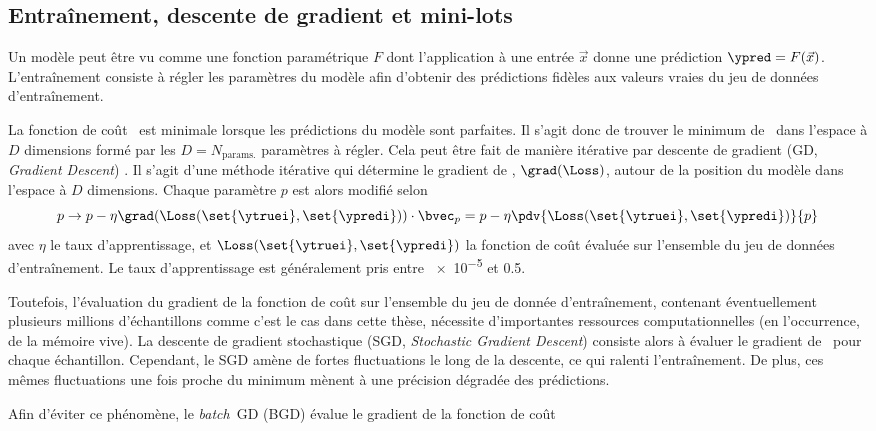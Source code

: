 \subsection{Entraînement, descente de gradient et mini-lots}\label{chapter-ML-section-gradient_descent}
Un modèle peut être vu comme une fonction paramétrique $F$
dont l'application à une entrée $\vec{x}$
donne une prédiction $\ypred=F(\vec{x})$.
L'entraînement consiste à régler les paramètres du modèle
afin d'obtenir des prédictions fidèles aux valeurs vraies du jeu de données d'entraînement.
\par
La fonction de coût \Loss\ est minimale lorsque les prédictions du modèle sont parfaites.
Il s'agit donc de trouver le minimum de \Loss\ dans l'espace à $D$ dimensions formé par les $D=N_\text{params.}$ paramètres à régler.
Cela peut être fait de manière itérative par descente de gradient (GD, \emph{Gradient Descent}) \cite{cauchy_1847}.
Il s'agit d'une méthode itérative qui détermine le gradient de \Loss, $\grad(\Loss)$, autour de la \og position \fg{} du modèle dans l'espace à $D$ dimensions.
Chaque paramètre $p$ est alors modifié selon
\begin{equation}
p \to p - \eta \grad(\Loss(\set{\ytruei}, \set{\ypredi})) \cdot \bvec_p = p - \eta \pdv{\Loss(\set{\ytruei}, \set{\ypredi})}{p}
\end{equation}
avec $\eta$ le taux d'apprentissage,
et
$\Loss(\set{\ytruei}, \set{\ypredi})$
la fonction de coût évaluée sur l'ensemble du jeu de données d'entraînement.
Le taux d'apprentissage est généralement pris entre \num{e-5} et \num{0.5}.
\par
Toutefois, l'évaluation du gradient de la fonction de coût sur l'ensemble du jeu de donnée d'entraînement,
contenant éventuellement plusieurs millions d'échantillons comme c'est le cas dans cette thèse,
nécessite d'importantes ressources computationnelles (en l'occurrence, de la mémoire vive).
La descente de gradient stochastique (SGD, \emph{Stochastic Gradient Descent})
consiste alors à évaluer le gradient de \Loss\ pour chaque échantillon.
Cependant, le SGD amène de fortes fluctuations le long de la descente,
ce qui ralenti l'entraînement.
De plus, ces mêmes fluctuations une fois proche du minimum mènent à une précision dégradée des prédictions.
\par
Afin d'éviter ce phénomène,
le \emph{batch}~GD (BGD) \cite{SGD}
évalue le gradient de la fonction de coût
